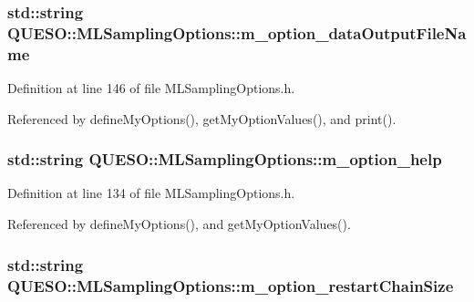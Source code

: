 \hypertarget{class_q_u_e_s_o_1_1_m_l_sampling_options_a3950ebf354b0ff038c3e0b5c2cc2efa9}{
\subsubsection[{m\-\_\-option\-\_\-data\-Output\-File\-Name}]{\setlength{\rightskip}{0pt plus 5cm}std\-::string Q\-U\-E\-S\-O\-::\-M\-L\-Sampling\-Options\-::m\-\_\-option\-\_\-data\-Output\-File\-Name\hspace{0.3cm}{\ttfamily [private]}}}\label{class_q_u_e_s_o_1_1_m_l_sampling_options_a3950ebf354b0ff038c3e0b5c2cc2efa9}


Definition at line 146 of file M\-L\-Sampling\-Options.\-h.



Referenced by define\-My\-Options(), get\-My\-Option\-Values(), and print().

\hypertarget{class_q_u_e_s_o_1_1_m_l_sampling_options_a5239a6e156de70d1f64b90e5885556d5}{
\subsubsection[{m\-\_\-option\-\_\-help}]{\setlength{\rightskip}{0pt plus 5cm}std\-::string Q\-U\-E\-S\-O\-::\-M\-L\-Sampling\-Options\-::m\-\_\-option\-\_\-help\hspace{0.3cm}{\ttfamily [private]}}}\label{class_q_u_e_s_o_1_1_m_l_sampling_options_a5239a6e156de70d1f64b90e5885556d5}


Definition at line 134 of file M\-L\-Sampling\-Options.\-h.



Referenced by define\-My\-Options(), and get\-My\-Option\-Values().

\hypertarget{class_q_u_e_s_o_1_1_m_l_sampling_options_ad37df327253d40983ac3e3ed880069c3}{
\subsubsection[{m\-\_\-option\-\_\-restart\-Chain\-Size}]{\setlength{\rightskip}{0pt plus 5cm}std\-::string Q\-U\-E\-S\-O\-::\-M\-L\-Sampling\-Options\-::m\-\_\-option\-\_\-restart\-Chain\-Size\hspace{0.3cm}{\ttfamily [private]}}}\label{class_q_u_e_s_o_1_1_m_l_sampling_options_ad37df327253d40983ac3e3ed880069c3}


